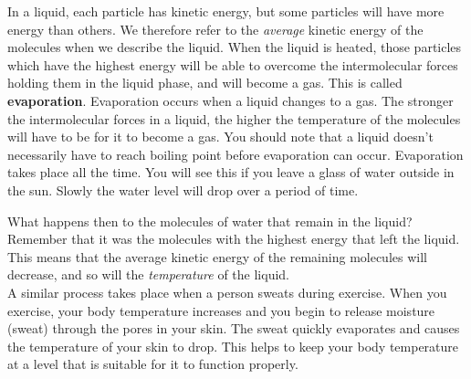 \begin{itemize}
{In a liquid, each particle has kinetic energy, but some particles will have more energy than others. We therefore refer to the \textit{average} kinetic energy of the molecules when we describe the liquid. When the liquid is heated, those particles which have the highest energy will be able to overcome the intermolecular forces holding them in the liquid phase, and will become a gas. This is called \textbf{evaporation}. Evaporation occurs when a liquid changes to a gas. The stronger the intermolecular forces in a liquid, the higher the temperature of the molecules will have to be for it to become a gas. You should note that a liquid doesn't necessarily have to reach boiling point before evaporation can occur. Evaporation takes place all the time. You will see this if you leave a glass of water outside in the sun. Slowly the water level will drop over a period of time.

What happens then to the molecules of water that remain in the liquid? Remember that it was the molecules with the highest energy that left the liquid. This means that the average kinetic energy of the remaining molecules will decrease, and so will the \textit{temperature} of the liquid.\\

A similar process takes place when a person sweats during exercise. When you exercise, your body temperature increases and you begin to release moisture (sweat) through the pores in your skin. The sweat quickly evaporates and causes the temperature of your skin to drop. This helps to keep your body temperature at a level that is suitable for it to function properly.}
\end{itemize}




